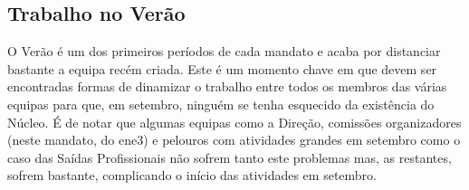 
\subsection{Trabalho no Verão}

O Verão é um dos primeiros períodos de cada mandato e acaba por distanciar bastante a equipa recém criada. Este é um momento chave em que devem ser encontradas formas de dinamizar o trabalho entre todos os membros das várias equipas para que, em setembro, ninguém se tenha esquecido da existência do Núcleo. É de notar que algumas equipas como a Direção, comissões organizadores (neste mandato, do \acrshort{ene3}) e pelouros com atividades grandes em setembro como o caso das Saídas Profissionais não sofrem tanto este problemas mas, as restantes, sofrem bastante, complicando o início das atividades em setembro.